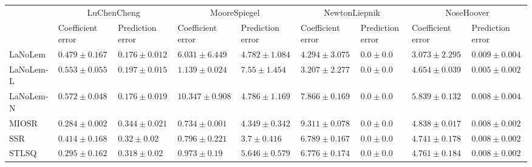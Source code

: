 \begin{table*}
{\begin{tabular}{lllllllll}
 & \multicolumn{2}{c}{LuChenCheng} & \multicolumn{2}{c}{MooreSpiegel} & \multicolumn{2}{c}{NewtonLiepnik} & \multicolumn{2}{c}{NoseHoover} \\
 & Coefficient error & Prediction error & Coefficient error & Prediction error & Coefficient error & Prediction error & Coefficient error & Prediction error \\
\midrule
LaNoLem & $0.479\pm 0.167$ & $0.176\pm 0.012$ & $6.031\pm 6.449$ & $4.782\pm 1.084$ & $4.294\pm 3.075$ & $0.0\pm 0.0$ & $\mathbf{3.073}\pm 2.295$ & $0.009\pm 0.004$ \\
LaNoLem-L & $0.553\pm 0.055$ & $0.197\pm 0.015$ & $1.139\pm 0.024$ & $7.55\pm 1.454$ & $\mathbf{3.207}\pm 2.277$ & $0.0\pm 0.0$ & $4.654\pm 0.039$ & $\mathbf{0.005}\pm 0.002$ \\
LaNoLem-N & $0.572\pm 0.048$ & $\mathbf{0.176}\pm 0.019$ & $10.347\pm 0.908$ & $4.786\pm 1.169$ & $7.866\pm 0.169$ & $\mathbf{0.0}\pm 0.0$ & $5.839\pm 0.132$ & $0.008\pm 0.004$ \\
MIOSR & $\mathbf{0.284}\pm 0.002$ & $0.344\pm 0.021$ & $\mathbf{0.734}\pm 0.001$ & $4.349\pm 0.342$ & $9.311\pm 0.078$ & $0.0\pm 0.0$ & $4.838\pm 0.017$ & $0.008\pm 0.002$ \\
SSR & $0.414\pm 0.168$ & $0.32\pm 0.02$ & $0.796\pm 0.221$ & $\mathbf{3.7}\pm 0.416$ & $6.789\pm 0.167$ & $0.0\pm 0.0$ & $4.741\pm 0.178$ & $0.008\pm 0.002$ \\
STLSQ & $0.295\pm 0.162$ & $0.318\pm 0.02$ & $0.973\pm 0.19$ & $5.646\pm 0.579$ & $6.776\pm 0.174$ & $0.0\pm 0.0$ & $4.761\pm 0.184$ & $0.008\pm 0.002$ \\

\bottomrule
\end{tabular}
}
\end{table*}
